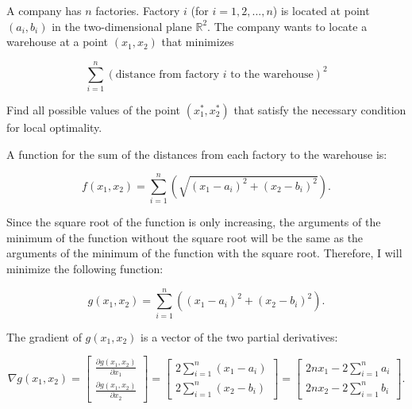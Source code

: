 \begin{homeworkProblem}
    A company has $n$ factories. Factory $i$ (for $i=1,2,...,n$) is located 
    at point $(a_i,b_i)$ in the two-dimensional plane $\mathbb R^2$. The 
    company wants to locate a warehouse at a point $(x_1,x_2)$ that minimizes 
    
    \begin{equation}
        \nonumber
        \sum_{i=1}^n (\text{distance from factory } i \text{ to the warehouse})^2
    \end{equation}
    
    Find all possible values of the point  $(x_1^*,x_2^*)$ that satisfy the 
    necessary condition for local optimality. \\
    
    \begin{solution}

        A function for the sum of the distances from each factory to the 
        warehouse is:
        
        \[
            f(x_1, x_2) = \sum_{i=1}^n \left(\sqrt{(x_1 - a_i)^2 + (x_2 - b_i)^2}\right).
        \]

        Since the square root of the function is only increasing, the 
        arguments of the minimum of the function without the square root 
        will be the same as the arguments of the minimum of the function 
        with the square root. Therefore, I will minimize the following 
        function:

        \[
            g(x_1, x_2) = \sum_{i=1}^n \left((x_1 - a_i)^2 + (x_2 - b_i)^2\right).
        \]

        The gradient of $g(x_1, x_2)$ is a vector of the two partial 
        derivatives:

        \[
            \nabla g(x_1, x_2) = 
            \begin{bmatrix}
                \frac{\partial g(x_1, x_2)}{\partial x_1} \\
                \frac{\partial g(x_1, x_2)}{\partial x_2}
            \end{bmatrix}
            =
            \begin{bmatrix}
                2\sum_{i=1}^n (x_1 - a_i) \\
                2\sum_{i=1}^n (x_2 - b_i)
            \end{bmatrix}
            =
            \begin{bmatrix}
                2n x_1 - 2\sum_{i=1}^n a_i \\
                2n x_2 - 2\sum_{i=1}^n b_i
            \end{bmatrix}.
        \]


\end{solution}
\end{homeworkProblem}
